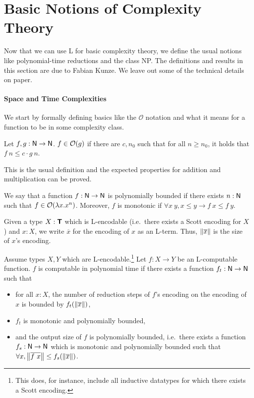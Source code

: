 \section{Basic Notions of Complexity Theory}\label{sec:np_basics}
Now that we can use L for basic complexity theory, we define the usual notions like polynomial-time reductions and the class \textsf{NP}. The definitions and results in this section are due to Fabian Kunze. We leave out some of the technical details on paper.

\paragraph{Space and Time Complexities}
We start by formally defining basics like the $\mathcal{O}$ notation and what it means for a function to be in some complexity class.

\begin{definition}[$\mathcal{O}$]
  Let $f, g : \mathsf{N} \rightarrow \mathsf{N}$. $f \in \mathcal{O}{(g)}$ if there are $c, n_0$ such that for all $n \ge n_0$, it holds that $f~n \le c \cdot g~n$.
\end{definition}
This is the usual definition and the expected properties for addition and multiplication can be proved. 

We say that a function $f : \mathsf{N} \rightarrow \mathsf{N}$ is polynomially bounded if there exists $n : \mathsf{N}$ such that $f \in \mathcal{O}{(\lambda x. x^n)}$. Moreover, $f$ is monotonic if $\forall x~y, x \le y \rightarrow f~x \le f~y$.

Given a type $X : \textsf{\bfseries T}$ which is L-encodable (i.e.\ there exists a Scott encoding for $X$) and $x : X$, we write $\overline{x}$ for the encoding of $x$ as an L-term. Thus, $\left\lVert\overline{x}\right\rVert$ is the size of $x$'s encoding. 

\begin{definition}
  Assume types $X, Y$ which are L-encodable.\footnote{This does, for instance, include all inductive datatypes for which there exists a Scott encoding.}
  Let $f : X \rightarrow Y$ be an L-computable function.  
  $f$ is computable in polynomial time if there exists a function $f_t : \mathsf{N} \rightarrow \mathsf{N}$ such that
  \begin{itemize}
    \item for all $x : X$, the number of reduction steps of $f$'s encoding on the encoding of $x$ is bounded by $f_t(\left\lVert\overline{x}\right\rVert)$, 
    \item $f_t$ is monotonic and polynomially bounded, 
    \item and the output size of $f$ is polynomially bounded, i.e.\ there exists a function $f_s : \mathsf{N} \rightarrow \mathsf{N}$ which is monotonic and polynomially bounded such that $\forall x, \left\lVert\overline{f~x}\right\rVert \le f_s (\left\lVert\overline{x}\right\rVert)$. 
  \end{itemize}
\end{definition}

